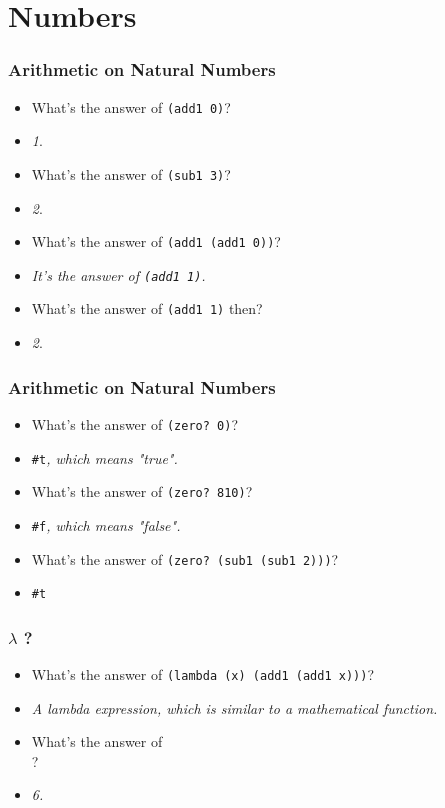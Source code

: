 \section{Numbers}

\begin{frame}[fragile]
  \frametitle{Arithmetic on Natural Numbers}
    \begin{itemize}
      \item What's the answer of \texttt{(add1 0)}?
      \item \emph{1}.
      \pause
      \item What's the answer of \texttt{(sub1 3)}?
      \item \emph{2}.
      \pause
      \item What's the answer of \texttt{(add1 (add1 0))}?
      \item \emph{It's the answer of \texttt{(add1 1)}.}
      \pause
      \item What's the answer of \texttt{(add1 1)} then?
      \item \emph{2}.
    \end{itemize}
\end{frame}

\begin{frame}[fragile]
  \frametitle{Arithmetic on Natural Numbers}
    \begin{itemize}
      \item What's the answer of \texttt{(zero? 0)}?
      \item \texttt{#t}\emph{, which means "true".}
      \pause
      \item What's the answer of \texttt{(zero? 810)}?
      \item \texttt{#f}\emph{, which means "false".}
      \pause
      \item What's the answer of \texttt{(zero? (sub1 (sub1 2)))}?
      \item \texttt{#t}
    \end{itemize}
\end{frame}

\begin{frame}[fragile]
  \frametitle{$\lambda$ ?}
    \begin{itemize}
      \item What's the answer of \texttt{(lambda (x) (add1 (add1 x)))}?
      \item \emph{A \textrm{lambda expression}, which is similar to a mathematical function.}
      \pause
      \item What's the answer of \\
      ?
      \item \emph{6.}
    \end{itemize}
\end{frame}

